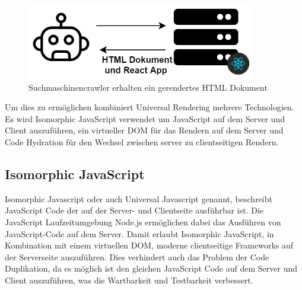 \documentclass[runningheads]{llncs}
\begin{document}
\begin{figure}[h]
  \centering
  \includegraphics[width=10cm]{images/universalseo}
  \caption{Suchmaschinencrawler erhalten ein gerendertes HTML Dokument}
  \label{Suchmaschinencrawler erhalten ein gerendertes HTML Dokument}
\end{figure}
Um dies zu ermöglichen kombiniert Universal Rendering mehrere Technologien. 
Es wird Isomorphic JavaScript verwendet um JavaScript auf dem Server und Client auszuführen, 
ein virtueller DOM für das Rendern auf dem Server und 
Code Hydration für den Wechsel zwischen server zu clientseitigen Rendern.

\subsection{Isomorphic JavaScript}
\label{subsec:Isomorphic JavaScript}
Isomorphic Javascript oder auch Universal Javascript genannt, 
beschreibt JavaScript Code der auf der Server- und Clientseite ausführbar ist. 
Die JavaScript Laufzeitumgebung Node.js ermöglichen dabei 
das Ausführen von JavaScript-Code auf dem Server. 
Damit erlaubt Isomorphic JavaScript, 
in Kombination mit einem virtuellen DOM, moderne clientseitige Frameworks auf der Serverseite auszuführen. 
Dies verhindert auch das Problem der Code Duplikation, 
da es möglich ist den gleichen JavaScript Code auf dem Server und Client auszuführen, 
was die Wartbarkeit und Testbarkeit verbessert.
\end{document}
